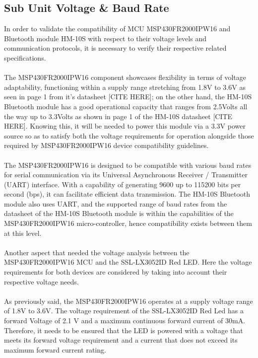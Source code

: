 \subsection{Sub Unit Voltage \& Baud Rate}
In order to validate the compatibility of MCU MSP430FR2000IPW16 and Bluetooth module HM-10S with respect to their voltage levels and communication protocols, it is necessary to verify their respective related specifications.\\\\
The MSP430FR2000IPW16 component showcases flexibility in terms of voltage adaptability, functioning within a supply range stretching from 1.8V to 3.6V as seen in page 1 from it’s datasheet [CITE HERE]; on the other hand, the HM-10S Bluetooth module has a good operational capacity that ranges from 2.5Volts all the way up to 3.3Volts as shown in page 1 of the HM-10S datasheet [CITE HERE]. Knowing this, it will be needed to power this module via a 3.3V power source so as to satisfy both the voltage requirements for operation alongside those required by MSP430FR2000IPW16 device compatibility guidelines.\\\\
The MSP430FR2000IPW16 is designed to be compatible with various baud rates for serial communication via its Universal Asynchronous Receiver / Transmitter (UART) interface. With a capability of generating 9600 up to 115200 bits per second (bps), it can facilitate efficient data transmission. The HM-10S Bluetooth module also uses UART, and the supported range of baud rates from the datasheet of the HM-10S Bluetooth module is within the capabilities of the MSP430FR2000IPW16 micro-controller, hence compatibility exists between them at this level.\\\\
Another aspect that needed the voltage analysis between the MSP430FR2000IPW16 MCU and the SSL-LX3052ID Red LED. Here the voltage requirements for both devices are considered by taking into account their respective voltage needs.\\\\
As previously said, the MSP430FR2000IPW16 operates at a supply voltage range of 1.8V to 3.6V. The voltage requirement of the SSL-LX3052ID Red Led has a forward Voltage of 2.1 V and a maximum continuous forward current of 30mA. Therefore, it needs to be ensured that the LED is powered with a voltage that meets its forward voltage requirement and a current that does not exceed its maximum forward current rating. \\\\
